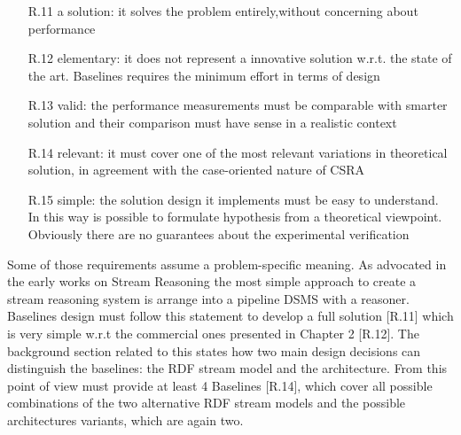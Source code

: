 \begin{enumerate}
\item[R.11] a solution: it solves the problem entirely,without concerning about performance %
\item[R.12] elementary: it does not represent a innovative solution w.r.t. the state of the art. Baselines requires the minimum effort in terms of design %
\item[R.13] valid: the performance measurements must be comparable with smarter solution and their comparison must have sense in a realistic context%
\item[R.14] relevant: it must cover one of the most relevant variations in theoretical solution, in agreement with the case-oriented nature of CSRA %
\item[R.15] simple: the solution design it implements must be easy to understand. In this way is possible to formulate hypothesis from a theoretical viewpoint. Obviously there are no guarantees about the experimental verification   %
\end{enumerate}

Some of those requirements assume a problem-specific meaning. As advocated in the early works on Stream Reasoning \cite{1,2} the most simple approach to create a stream reasoning system is arrange into a pipeline DSMS with a reasoner. Baselines design must follow this statement to develop a full solution [R.11] which is very simple w.r.t the commercial ones presented in Chapter 2 [R.12]. The background section related to this states how two main design decisions can distinguish the baselines: the RDF stream model and the architecture. From this point of view \name must provide at least 4 Baselines [R.14], which cover all possible combinations of the two alternative RDF stream models and the possible architectures variants, which are again two. 


